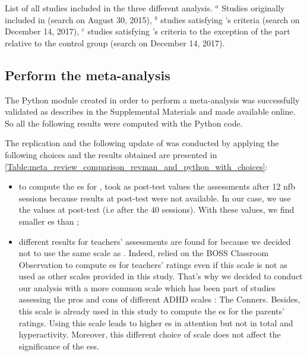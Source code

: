 \begin{table}[h!]
  \centering
  \caption{List of all studies included in the three different analysis. $^a$ Studies originally included in \citet{Cortese2016}
	(search on August 30, 2015), $^b$ studies satisfying \citet{Cortese2016}'s criteria (search on December 14, 2017), $^c$ studies 
	satisfying \citet{Cortese2016}'s criteria to the exception of the part relative to the control group (search on December 14, 2017).}
  
  \label{Table:table_factors_analysis_meta_analysis_list_studies}
\end{table}

\subsection{Perform the meta-analysis}

The Python module created in order to perform a meta-analysis was successfully validated as describes in the Supplemental Materials and made available online.
So all the following results were computed with the Python code. 

The replication and the following update of \citeauthor{Cortese2016} was conducted by applying the following choices and the results obtained are presented 
in \cref{Table:meta_review_comparison_revman_and_python_with_choices}:

\begin{itemize}
    \item to compute the \gls{es} for \citet{Arnold2014}, \citet{Cortese2016} took as post-test values the assessments after 12 \gls{nfb} sessions
		because results at post-test were not available. In our case, we use the values at post-test (i.e after the 40 sessions). With these values, 
		we find smaller \gls{es} than \citet{Cortese2016};  
    \item different results for teachers' assessments are found for \cite{Steiner2014} because we decided not to use the same scale 
		as \citeauthor{Cortese2016}. Indeed, \citeauthor{Cortese2016} relied on the BOSS Classroom Observation \citep{Shapiro2010} to compute \gls{es}
		for teachers' ratings even if this scale is not as used as other scales provided in this study. That's why we decided to conduct our analysis
		with a more common scale which has been part of studies assessing the pros and cons of different ADHD scales \citep{Epstein2012, Collett2003}: The Conners. 
		Besides, this scale is already used in this study to compute the \gls{es} for the parents' ratings. 
		Using this scale leads to higher \gls{es} in attention but not in total and hyperactivity. Moreover, this different choice of 
		scale does not affect the significance of the \glspl{es}.
\end{itemize}

